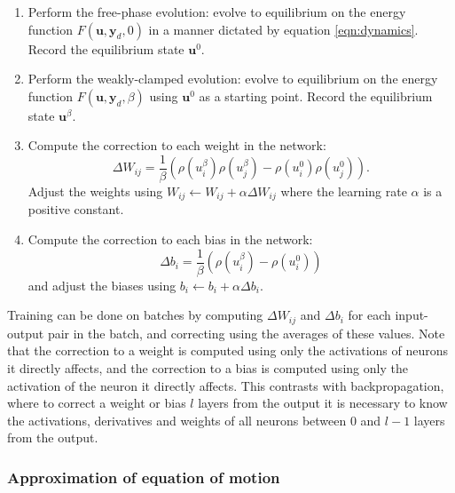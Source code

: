 \documentclass[format=sigconf]{acmart}
\newcommand{\mtx}[1]{\bm{#1}}
\begin{document}
\begin{enumerate}
\item Perform the free-phase evolution: evolve to equilibrium on the energy function $F(\mtx{u}, \mtx{y}_d, 0)$ in a manner dictated by equation \ref{eqn:dynamics}. Record the equilibrium state $\mtx{u}^0$.
\item Perform the weakly-clamped evolution: evolve to equilibrium on the energy function $F(\mtx{u},\mtx{y}_d,\beta)$ using $\mtx{u}^0$ as a starting point. Record the equilibrium state $\mtx{u}^{\beta}$.
\item Compute the correction to each weight in the network: 
\begin{equation}
\label{eqn:weight_correction}
\Delta W_{ij}=\frac{1}{\beta}(\rho(u_i^\beta)\rho(u_j^\beta)-\rho(u_i^0)\rho(u_j^0)).
\end{equation}
Adjust the weights using $W_{ij}\leftarrow W_{ij}+\alpha\Delta W_{ij}$ where the learning rate $\alpha$ is a positive constant.
\item Compute the correction to each bias in the network:
\begin{equation}
\Delta b_i=\frac{1}{\beta}(\rho(u_i^{\beta})-\rho(u_i^0))
\end{equation}
and adjust the biases using $b_i\leftarrow b_i+\alpha\Delta b_i$.
\end{enumerate}
Training can be done on batches by computing $\Delta W_{ij}$ and $\Delta b_i$ for each input-output pair in the batch, and correcting using the averages of these values. Note that the correction to a weight is computed using only the activations of neurons it directly affects, and the correction to a bias is computed using only the activation of the neuron it directly affects. This contrasts with backpropagation, where to correct a weight or bias $l$ layers from the output it is necessary to know the activations, derivatives and weights of all neurons between $0$ and $l-1$ layers from the output.

\subsubsection{Approximation of equation of motion}
\end{document}
